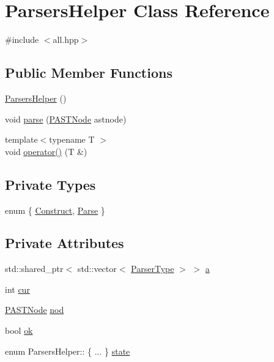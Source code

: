 \hypertarget{class_parsers_helper}{}\section{Parsers\+Helper Class Reference}
\label{class_parsers_helper}


{\ttfamily \#include $<$all.\+hpp$>$}

\subsection*{Public Member Functions}
\begin{DoxyCompactItemize}
\item 
\hyperlink{class_parsers_helper_a4abfe81f7251ffe4635c2ed2e482645d}{Parsers\+Helper} ()
\item 
void \hyperlink{class_parsers_helper_a21ce6213ee29e0459dd655c6803db00b}{parse} (\hyperlink{ast_8hpp_ab65291a3ef1ea9ec8e3d396783b77e46}{P\+A\+S\+T\+Node} astnode)
\item 
{\footnotesize template$<$typename T $>$ }\\void \hyperlink{class_parsers_helper_affae95c60593e3a8154f29e7b10daf17}{operator()} (T \&)
\end{DoxyCompactItemize}
\subsection*{Private Types}
\begin{DoxyCompactItemize}
\item 
enum \{ \hyperlink{class_parsers_helper_ac5239b5c4a61b2f239f668b738f613bea11c61fd76dd1cc499d0a82c995b29009}{Construct}, 
\hyperlink{class_parsers_helper_ac5239b5c4a61b2f239f668b738f613beae4bcb2b09e1ae01be6741b0d5dff5252}{Parse}
 \}
\end{DoxyCompactItemize}
\subsection*{Private Attributes}
\begin{DoxyCompactItemize}
\item 
std\+::shared\+\_\+ptr$<$ std\+::vector$<$ \hyperlink{parsers_2all_8hpp_abe36ed7c3b8a2eebe6d943c84fe72b9c}{Parser\+Type} $>$ $>$ \hyperlink{class_parsers_helper_a1c30abdf7ce5ad7d5e67237f88f18223}{a}
\item 
int \hyperlink{class_parsers_helper_a51c199f259d9aadab7d02681c9e57c49}{cur}
\item 
\hyperlink{ast_8hpp_ab65291a3ef1ea9ec8e3d396783b77e46}{P\+A\+S\+T\+Node} \hyperlink{class_parsers_helper_a37f84842cb32827280bff1663f43d750}{nod}
\item 
bool \hyperlink{class_parsers_helper_a88e598a10d698b0962efa12ee6121436}{ok}
\item 
enum Parsers\+Helper\+:: \{ ... \}  \hyperlink{class_parsers_helper_a268b5522cce719a0c28d3e48d9b5cc04}{state}
\end{DoxyCompactItemize}


